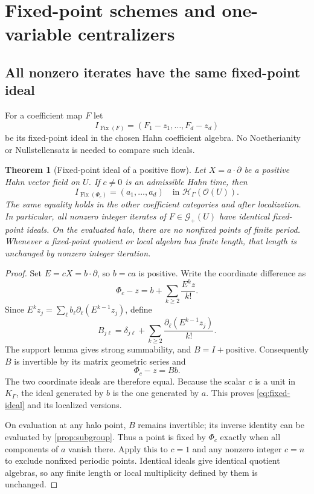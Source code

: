 \documentclass[11pt,letterpaper]{article}
\newtheorem{theorem}{Theorem}[section]
\theoremstyle{definition}
\theoremstyle{remark}
\newcommand{\HH}{\mathscr H}
\newcommand{\OO}{\mathcal O}
\newcommand{\GG}{\mathscr G}
\newcommand{\Fix}{\operatorname{Fix}}
\numberwithin{equation}{section}
\begin{document}
\section{Fixed-point schemes and one-variable centralizers}
\label{sec:fixed-central}

\subsection{All nonzero iterates have the same fixed-point ideal}
For a coefficient map $F$ let
\[
 I_{\Fix(F)}=(F_1-z_1,\ldots,F_d-z_d)
\]
be its fixed-point ideal in the chosen Hahn coefficient algebra. No
Noetherianity or Nullstellensatz is needed to compare such ideals.

\begin{theorem}[Fixed-point ideal of a positive flow]\label{thm:fixed-ideal}
Let $X=a\cdot\partial$ be a positive Hahn vector field on $U$. If $c\ne0$
is an admissible Hahn time, then
\begin{equation}\label{eq:fixed-ideal}
 I_{\Fix(\Phi_c)}=(a_1,\ldots,a_d)
 \quad\text{in }\HH_\Gamma(\OO(U)).
\end{equation}
The same equality holds in the other coefficient categories and after
localization. In particular, all nonzero integer iterates of
$F\in\GG_+(U)$ have identical fixed-point ideals. On the evaluated halo,
there are no nonfixed points of finite period. Whenever a fixed-point
quotient or local algebra has finite length, that length is unchanged by
nonzero integer iteration.
\end{theorem}
\begin{proof}
Set $E=cX=b\cdot\partial$, so $b=ca$ is positive. Write the coordinate
difference as
\[
 \Phi_c-z=b+\sum_{k\ge2}\frac{E^kz}{k!}.
\]
Since $E^kz_j=\sum_\ell b_\ell\partial_\ell(E^{k-1}z_j)$, define
\begin{equation}\label{eq:fixedmatrix}
 B_{j\ell}=\delta_{j\ell}+
       \sum_{k\ge2}\frac{\partial_\ell(E^{k-1}z_j)}{k!}.
\end{equation}
The support lemma gives strong summability, and $B=I+\text{positive}$.
Consequently $B$ is invertible by its matrix geometric series and
\begin{equation}\label{eq:fixedfactor}
 \Phi_c-z=Bb.
\end{equation}
The two coordinate ideals are therefore equal. Because the scalar $c$ is a
unit in $K_\Gamma$, the ideal generated by $b$ is the one generated by $a$.
This proves \eqref{eq:fixed-ideal} and its localized versions.

On evaluation at any halo point, $B$ remains invertible; its inverse
identity can be evaluated by \cref{prop:subgroup}. Thus a point is fixed by
$\Phi_c$ exactly when all components of $a$ vanish there. Apply this to
$c=1$ and any nonzero integer $c=n$ to exclude nonfixed periodic points.
Identical ideals give identical quotient algebras, so any finite length or
local multiplicity defined by them is unchanged.
\end{proof}
\end{document}
